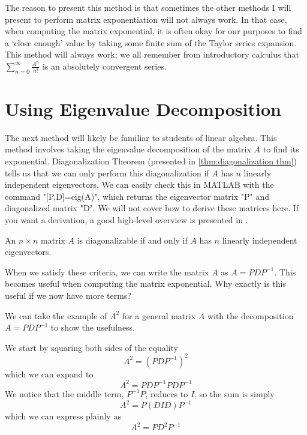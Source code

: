 The reason to present this method is that sometimes the other methods I will present to perform matrix exponentiation will not always work. In that case, when computing the matrix exponential, it is often okay for our purposes to find a `close enough' value by taking some finite sum of the Taylor series expansion. This method will always work; we all remember from introductory calculus that $\sum_{n=0}^\infty{\frac{A^n}{n!}}$ is an absolutely convergent series.

\section{Using Eigenvalue Decomposition}
The next method will likely be familiar to students of linear algebra. This method involves taking the eigenvalue decomposition of the matrix $A$ to find its exponential. Diagonalization Theorem (presented in \autoref{thm:diagonalization thm}) tells us that we can only perform this diagonalization if $A$ has $n$ linearly independent eigenvectors. We can easily check this in MATLAB with the command "[P,D]=eig(A)", which returns the eigenvector matrix "P" and diagonalized matrix "D". We will not cover how to derive these matrices here. If you want a derivation, a good high-level overview is presented in \cite{michael_penn_matrix_2022}.

\begin{theorem}\label{thm:diagonalization thm}
    An $n{\times}n$ matrix $A$ is diagonalizable if and only if $A$ has $n$ linearly independent eigenvectors.
\end{theorem}

When we satisfy these criteria, we can write the matrix $A$ as $A=PDP^{-1}$. This becomes useful when computing the matrix exponential. Why exactly is this useful if we now have more terms?

\begin{example}
    We can take the example of $A^2$ for a general matrix $A$ with the decomposition $A=PDP^{-1}$ to show the usefulness. 
    
We start by squaring both sides of the equality $$A^2=\left(PDP^{-1}\right)^2$$ which we can expand to $$A^2=PDP^{-1}PDP^{-1}$$
We notice that the middle term, $P^{-1}P$, reduces to $I$, so the sum is simply $$A^2=P(DID)P^{-1}$$which we can express plainly as $$A^2=PD^2P^{-1}$$
\end{example}

